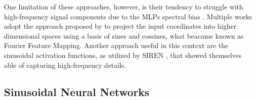 


One limitation of these approaches, however, is their tendency to struggle with high-frequency signal components due to the MLPs spectral bias \citep{rahaman2018spectral}. Multiple works adopt the approach proposed by \cite{tancik2020fourfeat} to project the input coordinates into higher dimensional spaces using a basis of sines and cossines, what beacame known as Fourier Feature Mapping. Another approach useful in this context are the sinusoidal activation functions, as utilized by SIREN \cite{sitzmann2019siren}, that showed themselves able of capturing high-frequency details.



\subsection{Sinusoidal Neural Networks}

